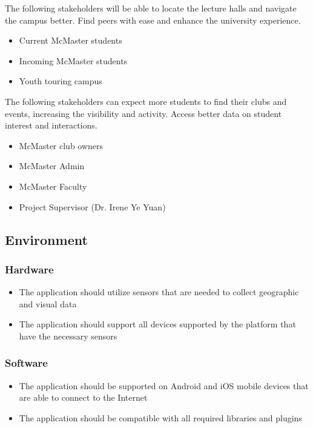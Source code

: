 \documentclass{article}
\begin{document}
\quad The following stakeholders will be able to locate the lecture halls and navigate the campus better. Find peers with ease and enhance the university experience.

\begin{itemize}
    \item Current McMaster students
    \item Incoming McMaster students    
    \item Youth touring campus
\end{itemize}
    \quad The following stakeholders can expect more students to find their clubs and events, increasing the visibility and activity. Access better data on student interest and interactions. 
\begin{itemize}
    \item McMaster club owners
    \item McMaster Admin
    \item McMaster Faculty
    \item Project Supervisor (Dr. Irene Ye Yuan)
\end{itemize}

\subsection{Environment}
\subsubsection{Hardware}
\begin{itemize}
    \item The application should utilize sensors that are needed to collect geographic and visual data
    \item The application should support all devices supported by the platform that have the necessary sensors
\end{itemize}

\subsubsection{Software}
\begin{itemize}
    \item The application should be supported on Android and iOS mobile devices that are able to connect to the Internet
    \item The application should be compatible with all required libraries and plugins
\end{itemize}
\end{document}
